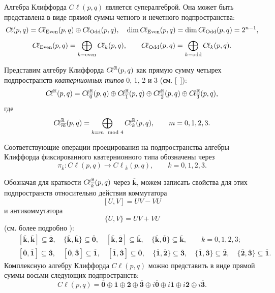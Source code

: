 Алгебра Клиффорда ${{C}\!\ell}(p,q)$ является супералгеброй. 
Она может быть представлена в виде прямой суммы четного и нечетного подпространства:
$${{C}\!\ell}(p,q)={{C}\!\ell}_{\mathop{\rm Even}}(p,q)\oplus{{C}\!\ell}_{\mathop{\rm Odd}}(p,q),\quad \dim{{C}\!\ell}_{\mathop{\rm Even}}(p,q)=\dim{{C}\!\ell}_{\mathop{\rm Odd}}(p,q)=2^{n-1},$$
$${{C}\!\ell}_{\mathop{\rm Even}}(p,q)=\bigoplus_{k - \text{even}}{{C}\!\ell}_k(p,q),\qquad {{C}\!\ell}_{\mathop{\rm Odd}}(p,q)=\bigoplus_{k - \text{odd}}{{C}\!\ell}_k(p,q).$$

Представим алгебру Клиффорда ${{C}\!\ell}^{\Bbb R}(p,q)$ как прямую сумму четырех подпространств {\it кватернионных типов} 0, 1, 2 и 3 (см. [--]):
\begin{equation}
{{C}\!\ell}^{\Bbb R}(p,q)={{C}\!\ell}^{\Bbb R}_{\overline 0}(p,q)\oplus{{C}\!\ell}^{\Bbb R}_{\overline 1}(p,q)\oplus
{{C}\!\ell}^{\Bbb R}_{\overline 2}(p,q)\oplus{{C}\!\ell}^{\Bbb R}_{\overline 3}(p,q),\label{shirokov:kv}
\end{equation}
где
\begin{equation}
{{C}\!\ell}^{\Bbb R}_{\overline m}(p,q)=\bigoplus_{k=m\mod 4}  {{C}\!\ell}^{\Bbb R}_k(p,q),\qquad m=0, 1, 2, 3.
\label{shirokov:kv-1}
\end{equation}

Соответствующие операции проецирования на подпространства алгебры Клиффорда фиксированного кватернионного типа обозначены через 
$$\pi_{\overline k}:{{C}\!\ell}(p,q)\to {{C}\!\ell}_{\overline k}(p,q),\qquad k=0, 1, 2, 3.$$

Обозначая для краткости ${{C}\!\ell}^{\Bbb R}_{\overline k}(p,q)$ через $\overline{\textbf{k}}$, можем записать  свойства для этих подпространств относительно действия коммутатора $$[U,V]=UV-VU$$ и антикоммутатора $$\{U,V\}=UV+VU$$ (см. более подробно \cite{shir:quat1,shir:quat2}):
\begin{eqnarray*}
&&[\overline{\textbf{k}},\overline{\textbf{k}}]\subseteq\overline{\textbf{2}},\quad \{\overline{\textbf{k}},\overline{\textbf{k}}\}\subseteq\overline{\textbf{0}},\quad [\overline{\textbf{k}},\overline{\textbf{2}}]\subseteq\overline{\textbf{k}}, \quad \{\overline{\textbf{k}},\overline{\textbf{0}}\}\subseteq\overline{\textbf{k}},\qquad k=0, 1, 2, 3 \nonumber;\label{shirokov:1}\\
&&[\overline{\textbf{0}},\overline{\textbf{1}}]\subseteq\overline{\textbf{3}}, \quad  [\overline{\textbf{0}},\overline{\textbf{3}}]\subseteq\overline{\textbf{1}}, \quad [\overline{\textbf{1}},\overline{\textbf{3}}]\subseteq\overline{\textbf{0}},\quad \{\overline{\textbf{1}},\overline{\textbf{2}}\}\subseteq\overline{\textbf{3}},  \quad \{\overline{\textbf{1}},\overline{\textbf{3}}\}\subseteq\overline{\textbf{2}}, \quad \{\overline{\textbf{2}},\overline{\textbf{3}}\}\subseteq\overline{\textbf{1}}\nonumber.
\end{eqnarray*}
Комплексную алгебру Клиффорда ${{C}\!\ell}(p,q)$ можно представить в виде прямой суммы восьми следующих подпространств:
$${{C}\!\ell}(p,q)=\overline{\textbf{0}}\oplus\overline{\textbf{1}}\oplus\overline{\textbf{2}}\oplus\overline{\textbf{3}} \oplus i\overline{\textbf{0}}\oplus i\overline{\textbf{1}}\oplus i\overline{\textbf{2}}\oplus i\overline{\textbf{3}}.$$

